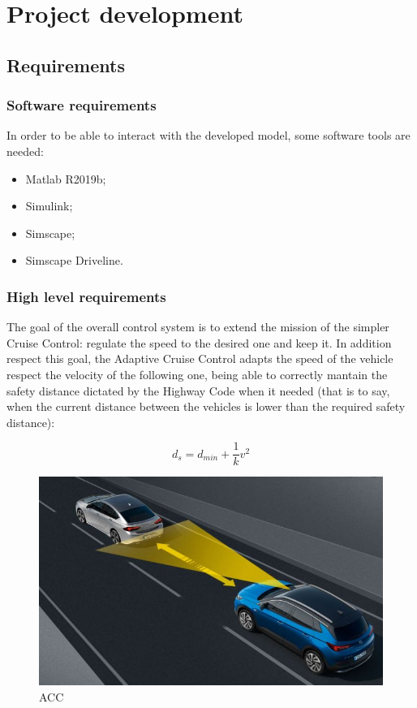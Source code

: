 \documentclass[12pt,a4paper]{report}
\begin{document}
\chapter{Project development}

\section{Requirements}
\subsection{Software requirements}

In order to be able to interact with the developed model, some software tools are needed:

\begin{itemize}
	
	\item Matlab R2019b;
	
	\item Simulink;
	
	\item Simscape;
	
	\item Simscape Driveline.
	
\end{itemize}

\subsection{High level requirements}

The goal of the overall control system is to extend the mission of the simpler Cruise Control: regulate the speed to the desired one and keep it. In addition respect this goal, the Adaptive Cruise Control adapts the speed of the vehicle respect the velocity of the following one, being able to correctly mantain the safety distance dictated by the Highway Code when it needed (that is to say, when the current distance between the vehicles is lower than the required safety distance):

\begin{equation*}
	d_s=d_{min}+\dfrac{1}{k}v^2
\end{equation*}

\begin{figure}[htbp]
	\centering
	\includegraphics{ACC.jpg}
	\caption{ACC}
\end{figure}
\end{document}
